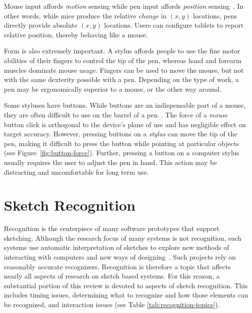 Mouse input affords \textit{motion} sensing while pen input
affords \textit{position} sensing~\cite{hinckley-input-technology}. In
other words, while mice produce the relative \textit{change} in
$(x,y)$ locations, pens directly provide absolute $(x,y)$ locations.
Users can configure tablets to report relative position, thereby
behaving like a mouse.

Form is also extremely important. A stylus affords people to use the
fine motor abilities of their fingers to control the tip of the pen,
whereas hand and forearm muscles dominate mouse usage. Fingers can be
used to move the mouse, but not with the same dexterity possible with
a pen. Depending on the type of work, a pen may be ergonomically
superior to a mouse, or the other way around.



Some styluses have buttons. While buttons are an indispensable part of
a mouse, they are often difficult to use on the barrel of a
pen~\cite{plimmer-pen-usability}. The force of a \textit{mouse} button
click is orthogonal to the device's plane of use and has negligible
effect on target accuracy. However, pressing buttons on a
\textit{stylus} can move the tip of the pen, making it difficult to
press the button while pointing at particular objects (see
Figure~\ref{fig:button-force}). Further, pressing a button on a
computer stylus usually requires the user to adjust the pen in
hand. This action may be distracting and uncomfortable for long term
use.

\section{Sketch Recognition}

Recognition is the centerpiece of many software prototypes that
support sketching. Although the research focus of many systems is not
recognition, such systems use automatic interpretation of sketches to
explore new methods of interacting with computers and new ways of
designing~\cite{gross-boe,grundy-maramasketch,lin-denim}. Such
projects rely on reasonably accurate recognizers. Recognition is
therefore a topic that affects nearly all aspects of research on
sketch based systems. For this reason, a substantial portion of this
review is devoted to aspects of sketch recognition. This includes
timing issues, determining what to recognize and how those elements
can be recognized, and interaction issues (see
Table \ref{tab:recognition-topics}).

